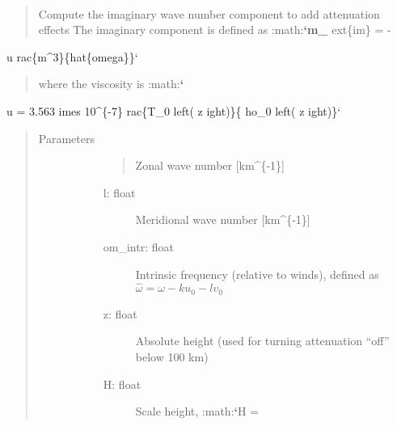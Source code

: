 \documentclass[letterpaper,10pt,english]{sphinxmanual}
\begin{document}

\begin{fulllineitems}
\label{\detokenize{stochprop.gravity:stochprop.gravity_waves.m_imag}}~\begin{quote}

Compute the imaginary wave number component to add attenuation effects
The imaginary component is defined as :math:{\color{red}\bfseries{}{}`}{\color{red}\bfseries{}m\_} ext\{im\} = -
\end{quote}

u 
rac\{m\textasciicircum{}3\}\{hat\{omega\}\}{}`
\begin{quote}

where the viscosity is :math:{\color{red}\bfseries{}{}`}
\end{quote}

u = 3.563       imes 10\textasciicircum{}\{-7\} 
rac\{T\_0 left( z 
ight)\}\{
ho\_0 left( z 
ight)\}{}`
\begin{quote}\begin{description}
\item[{Parameters}] \leavevmode\begin{description}
\item[{}] \leavevmode\begin{quote}

Zonal wave number {[}km\textasciicircum{}\{-1\}{]}
\end{quote}
\begin{description}
\item[{l: float}] \leavevmode
Meridional wave number {[}km\textasciicircum{}\{-1\}{]}

\item[{om\_intr: float}] \leavevmode
Intrinsic frequency (relative to winds), defined as \(\hat{\omega} = \omega - k u_0 - l v_0\)

\item[{z: float}] \leavevmode
Absolute height (used for turning attenuation “off” below 100 km)

\item[{H: float}] \leavevmode
Scale height, :math:{\color{red}\bfseries{}{}`}H =

\end{description}


\end{description}
\end{description}
\end{quote}
\end{fulllineitems}
\end{document}
